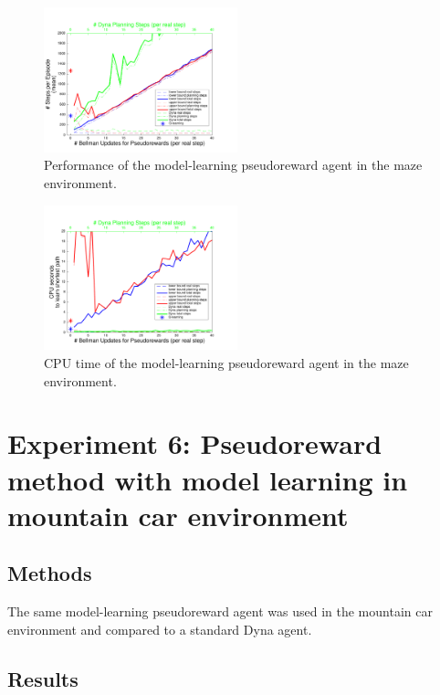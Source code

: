 \documentclass[letterpaper]{article}
\begin{document}
\begin{figure}[ht]
\centering
\includegraphics[width=0.5\textwidth]{learning_vs_PRiterationsLearnMod_DYNA_mean}
\caption{Performance of the model-learning pseudoreward agent in the maze environment.}
\label{fig:S3a}
\end{figure}

\begin{figure}[ht]
\centering
\includegraphics[width=0.5\textwidth]{cpus_vs_PRiterationsLearnMod_DYNA_toGoal}
\caption{CPU time of the model-learning pseudoreward agent in the maze environment.}
\label{fig:S3b}
\end{figure}

\section{Experiment 6: Pseudoreward method with model learning in mountain car environment}

\subsection{Methods}

The same model-learning pseudoreward agent was used in the mountain car environment and compared to a standard Dyna agent.

\subsection{Results}
\end{document}
